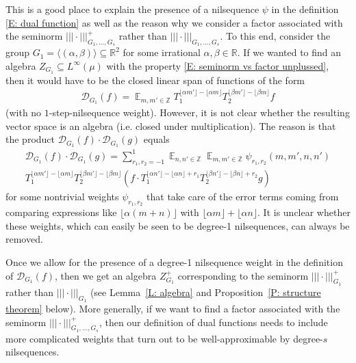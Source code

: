 \documentclass[11pt]{amsart}
\theoremstyle{definition}
\DeclareMathOperator*{\E}{\mathbb{E}}
\newcommand{\R}{{\mathbb R}}
\newcommand{\Z}{{\mathbb Z}}
\newcommand{\CD}{{\mathcal D}}
\newcommand{\nnorm}[1]{\lvert\!|\!| #1|\!|\!\rvert}
\newcommand{\1}{{\mathbf{1}}}
\newcommand{\sfloor}[1]{{\lfloor #1 \rfloor}}
\begin{document}
This is a good place to explain the presence of a nilsequence $\psi$ in the definition \eqref{E: dual function} as well as the reason why we consider a factor associated with the seminorm $\nnorm{\cdot}_{G_1, \ldots, G_s}^+$ rather than $\nnorm{\cdot}_{G_1, \ldots, G_s}$. To this end, consider the group ${G_1} = \langle (\alpha, \beta)\rangle\subseteq\R^2$ for some irrational $\alpha,\beta\in\R$. If we wanted to find an algebra $Z_{G_1}\subseteq L^\infty(\mu)$ with the property \eqref{E: seminorm vs factor unplussed}, then it would have to be the closed linear span of functions of the form
\begin{align*}
    \CD_{G_1}(f) = \E_{m,m'\in\Z} T_1^{\sfloor{\alpha m'}-\sfloor{\alpha m}}T_2^{\sfloor{\beta m'}-\sfloor{\beta m}}f
\end{align*}
(with no $1$-step-nilsequence weight). However, it is not clear whether the resulting vector space is an algebra (i.e. closed under multiplication). The reason is that the product $\CD_{G_1}(f)\cdot\CD_{G_1}(g)$ equals
\begin{multline*}
    \CD_{G_1}(f)\cdot\CD_{G_1}(g) = \sum_{r_1,r_2=-1}^1\E_{n,n'\in\Z}\E_{m,m'\in\Z}\psi_{r_1,r_2}(m,m',n,n')\\
    T_1^{\sfloor{\alpha m'}-\sfloor{\alpha m}}T_2^{\sfloor{\beta m'}-\sfloor{\beta m}}(f\cdot T_1^{\sfloor{\alpha n'}-\sfloor{\alpha n}+r_1}T_2^{\sfloor{\beta n'}-\sfloor{\beta n}+r_2}g)
\end{multline*}
for some nontrivial weights $\psi_{r_1,r_2}$ that take care of the error terms coming from comparing expressions like $\sfloor{\alpha (m+n)}$ with $\sfloor{\alpha m} + \sfloor{\alpha n}$. It is unclear whether these weights, which can easily be seen to be degree-1 nilsequences, can always be removed. 

Once we allow for the presence of a degree-1 nilsequence weight in the definition of $\CD_{G_1}(f)$, then we get an algebra $Z_{G_1}^+$ corresponding to the seminorm $\nnorm{\cdot}_{{G_1}}^+$ rather than $\nnorm{\cdot}_{{G_1}}$ (see Lemma~\ref{L: algebra} and Proposition~\ref{P: structure theorem} below). More generally, if we want to find a factor associated with the seminorm $\nnorm{\cdot}_{G_1, \ldots, G_s}^+$, then our definition of dual functions needs to include more complicated weights that turn out to be well-approximable by degree-$s$ nilsequences.
\end{document}
